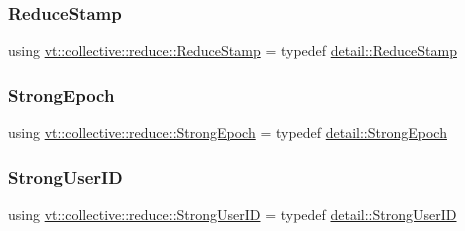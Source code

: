 \subsubsection{\texorpdfstring{Reduce\+Stamp}{ReduceStamp}}
{\footnotesize\ttfamily using \hyperlink{namespacevt_1_1collective_1_1reduce_a7b7cb3021ac5654d92825d9fab0250b2}{vt\+::collective\+::reduce\+::\+Reduce\+Stamp} = typedef \hyperlink{namespacevt_1_1collective_1_1reduce_1_1detail_aacc1fcd729d934ba143fee3a943bf9e7}{detail\+::\+Reduce\+Stamp}}

\mbox{\label{namespacevt_1_1collective_1_1reduce_a0b5fbe1e89aea537d76fda4c57f2099e}} 
\subsubsection{\texorpdfstring{Strong\+Epoch}{StrongEpoch}}
{\footnotesize\ttfamily using \hyperlink{namespacevt_1_1collective_1_1reduce_a0b5fbe1e89aea537d76fda4c57f2099e}{vt\+::collective\+::reduce\+::\+Strong\+Epoch} = typedef \hyperlink{namespacevt_1_1collective_1_1reduce_1_1detail_ad6739d14b8ee41189f785355708748fc}{detail\+::\+Strong\+Epoch}}

\mbox{\label{namespacevt_1_1collective_1_1reduce_a49e47347201b1b0fdb552ed4b7c86331}} 
\subsubsection{\texorpdfstring{Strong\+User\+ID}{StrongUserID}}
{\footnotesize\ttfamily using \hyperlink{namespacevt_1_1collective_1_1reduce_a49e47347201b1b0fdb552ed4b7c86331}{vt\+::collective\+::reduce\+::\+Strong\+User\+ID} = typedef \hyperlink{namespacevt_1_1collective_1_1reduce_1_1detail_af9e42b20d1be7dccc1b5e587f0387e02}{detail\+::\+Strong\+User\+ID}}

\mbox{\label{namespacevt_1_1collective_1_1reduce_ae3111ccd7e2214f079222e4c016b6652}} 

